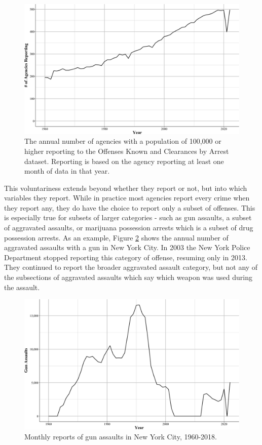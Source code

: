 \documentclass[
  12pt,
  openany]{book}
\begin{document}
\begin{figure}

{\centering \includegraphics[width=0.9\linewidth]{ucrbook_files/figure-latex/bigAgenciesReporting-1} 

}

\caption{The annual number of agencies with a population of 100,000 or higher reporting to the Offenses Known and Clearances by Arrest dataset. Reporting is based on the agency reporting at least one month of data in that year.}\label{fig:bigAgenciesReporting}
\end{figure}

This voluntariness extends beyond whether they report or not, but into which variables they report. While in practice most agencies report every crime when they report any, they do have the choice to report only a subset of offenses. This is especially true for subsets of larger categories - such as gun assaults, a subset of aggravated assaults, or marijuana possession arrests which is a subset of drug possession arrests. As an example, Figure \ref{fig:nycGunAssaults} shows the annual number of aggravated assaults with a gun in New York City. In 2003 the New York Police Department stopped reporting this category of offense, resuming only in 2013. They continued to report the broader aggravated assault category, but not any of the subsections of aggravated assaults which say which weapon was used during the assault.

\begin{figure}

{\centering \includegraphics[width=0.9\linewidth]{ucrbook_files/figure-latex/nycGunAssaults-1} 

}

\caption{Monthly reports of gun assaults in New York City, 1960-2018.}\label{fig:nycGunAssaults}
\end{figure}
\end{document}
